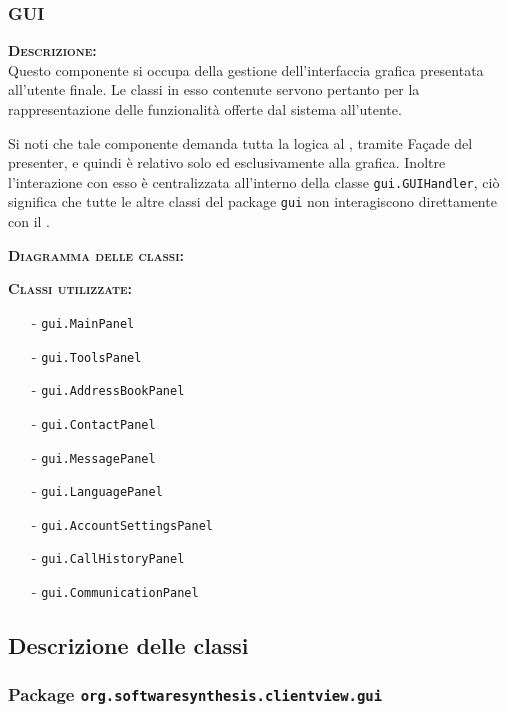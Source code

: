 \subsubsection{GUI}\label{sec:gui}
\begin{description}
	\item{\scshape\bfseries Descrizione:}\\
Questo componente si occupa della gestione dell'interfaccia grafica presentata all'utente finale. Le classi in esso contenute servono pertanto per la rappresentazione delle funzionalità offerte dal sistema all'utente.

Si noti che tale componente demanda tutta la logica al , tramite Façade del presenter, e quindi è relativo solo ed esclusivamente alla grafica. Inoltre l'interazione con esso è centralizzata all'interno della classe \texttt{gui.GUIHandler}, ciò significa che tutte le altre classi del package \texttt{gui} non interagiscono direttamente con il .
	\item{\scshape\bfseries Diagramma delle classi:}
	
	\item{\scshape\bfseries Classi utilizzate:} 
	\begin{itemize}[noitemsep,nolistsep]
		\item[-] \texttt{gui.MainPanel}
		\item[-] \texttt{gui.ToolsPanel}
		\item[-] \texttt{gui.AddressBookPanel}
		\item[-] \texttt{gui.ContactPanel}
		\item[-] \texttt{gui.MessagePanel}
		\item[-] \texttt{gui.LanguagePanel}
		\item[-] \texttt{gui.AccountSettingsPanel}
		\item[-] \texttt{gui.CallHistoryPanel}
		\item[-] \texttt{gui.CommunicationPanel}
	\end{itemize}  
\end{description}

\subsection{Descrizione delle classi}

\subsubsection{Package \texttt{org.softwaresynthesis.clientview.gui}}

